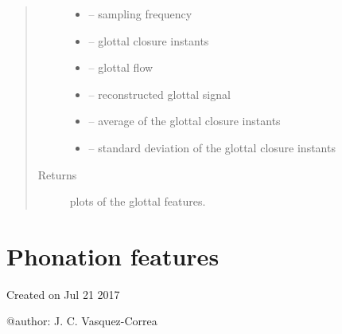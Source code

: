 \documentclass[letterpaper,10pt,english]{sphinxmanual}
\begin{document}
\begin{fulllineitems}
\begin{fulllineitems}
\begin{quote}
\begin{description}
\begin{itemize}
\item {} 
 -- sampling frequency

\item {} 
 -- glottal closure instants

\item {} 
 -- glottal flow

\item {} 
 -- reconstructed glottal signal

\item {} 
 -- average of the glottal closure instants

\item {} 
 -- standard deviation of the glottal closure instants

\end{itemize}

\item[{Returns}] \leavevmode
plots of the glottal features.

\end{description}\end{quote}

\end{fulllineitems}


\end{fulllineitems}



\chapter{Phonation features}
\label{\detokenize{Phonation::doc}}\label{\detokenize{Phonation:module-phonation}}\label{\detokenize{Phonation:phonation-features}}
Created on Jul 21 2017

@author: J. C. Vasquez-Correa
\end{document}
